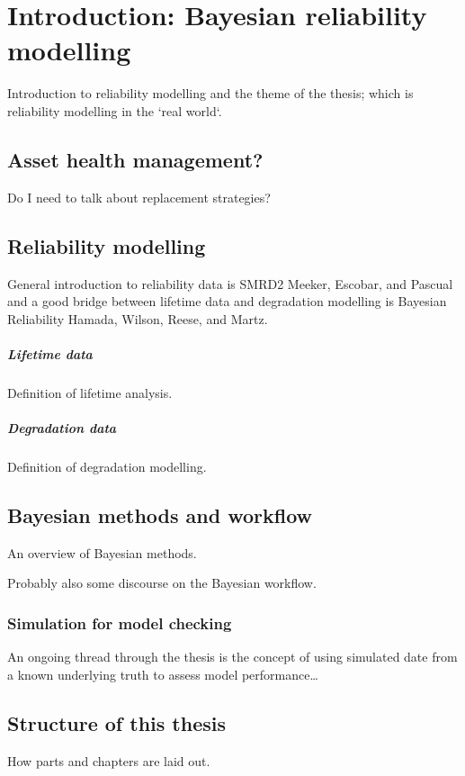 \chapter{Introduction: Bayesian reliability modelling}\label{chap:chapter1}

Introduction to reliability modelling and the theme of the thesis; which is reliability modelling in the `real world`.

\section{Asset health management?}

Do I need to talk about replacement strategies?

\section{Reliability modelling}

General introduction to reliability data is SMRD2 Meeker, Escobar, and Pascual and a good bridge between lifetime data and degradation modelling is Bayesian Reliability Hamada, Wilson, Reese, and Martz.

\paragraph*{Lifetime data}

Definition of lifetime analysis.

\paragraph*{Degradation data}

Definition of degradation modelling.

\section{Bayesian methods and workflow}

An overview of Bayesian methods.

Probably also some discourse on the Bayesian workflow.

\subsection{Simulation for model checking}

An ongoing thread through the thesis is the concept of using simulated date from a known underlying truth to assess model performance\ldots

\section{Structure of this thesis}

How parts and chapters are laid out.